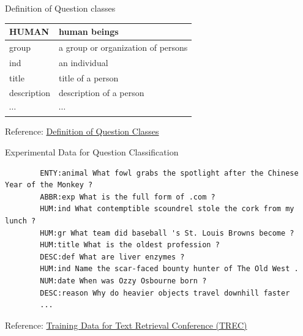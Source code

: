 \begin{frame}[fragile,shrink=20]{Definition of Question classes}
\begin{minipage}[t]{0.49\linewidth}
\begin{tabular}{|>{\raggedright\arraybackslash}m{3cm}|>{\raggedright\arraybackslash}m{3cm}|}
           \hline
           HUMAN & human beings  \\
           \hline
           group & a group or organization of persons  \\
           \hline
           ind & an individual \\
           \hline
           title & title of a person \\
           \hline
           description & description of a person \\
           \hline
           $\cdots$&$\cdots$\\
           \hline
       \end{tabular}
    \end{minipage}
    Reference: \href{https://cogcomp.seas.upenn.edu/Data/QA/QC/definition.html}{Definition of Question Classes}
\end{frame}

\begin{frame}{Experimental Data for Question Classification}
    \small
    \begin{verbatim}
        ENTY:animal What fowl grabs the spotlight after the Chinese Year of the Monkey ?
        ABBR:exp What is the full form of .com ?
        HUM:ind What contemptible scoundrel stole the cork from my lunch ?
        HUM:gr What team did baseball 's St. Louis Browns become ?
        HUM:title What is the oldest profession ?
        DESC:def What are liver enzymes ?
        HUM:ind Name the scar-faced bounty hunter of The Old West .
        NUM:date When was Ozzy Osbourne born ?
        DESC:reason Why do heavier objects travel downhill faster
        ...
    \end{verbatim}
    Reference: \href{https://cogcomp.seas.upenn.edu/Data/QA/QC/}{Training Data for Text Retrieval Conference (TREC)}
\end{frame}

